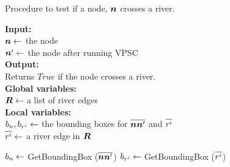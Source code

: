 \begin{algorithm}[tb!]
    \caption{Procedure to test if a node, $ \bm{n} $ crosses a river.}\label{alg:check river intersection}
    \textbf{Input:} \\
    $ \bm{n} \gets $ the node \\
    $ \bm{n}' \gets $ the node after running VPSC \\

    \textbf{Output:} \\
    Returns $ True $ if the node crosses a river. \\

    \textbf{Global variables:} \\
    $ \bm{R} \gets $ a list of river edges \\

    \textbf{Local variables:} \\
    $ b_n, b_{r^i} \gets $ the bounding boxes for $ \protect\overline{\bm{n}\bm{n}'} $ and $ \protect\overline{r^i} $ \\
    $ \protect\overline{r^i} \gets $ a river edge in $ \bm{R} $ \\ 

    \begin{algorithmic}[1]
        
        \ForEach{$ \riverEdgeListEachLine \in \riverEdgeList $}
            \State $ b_n \gets $ GetBoundingBox ($ \protect\overline{\bm{n}\bm{n}'} $)
            \State $ b_{r^i} \gets $ GetBoundingBox ($ \protect\overline{r^i} $)

                    \State {}
                \EndIf
            
                \EndIf
        \EndFor
        
        \State {}
        \EndProcedure
    \end{algorithmic}
\end{algorithm}

